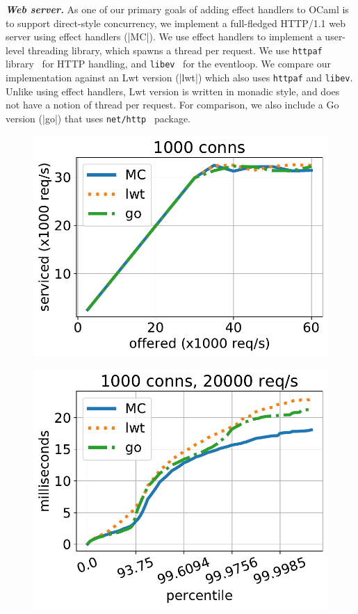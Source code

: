 \documentclass[sigplan,10pt,review,anonymous]{acmart}\settopmatter{printfolios=true,printccs=false,printacmref=false}
\begin{document}
\textbf{\textit{Web server.}} As one of our primary goals of adding effect handlers to
OCaml is to support direct-style concurrency, we implement a full-fledged
HTTP/1.1 web server using effect handlers (|MC|). We use effect handlers to
implement a user-level threading library, which spawns a thread per request. We
use \texttt{httpaf} library~\cite{httpaf} for HTTP handling, and
\texttt{libev}~\cite{libev} for the eventloop. We compare our implementation
against an Lwt version (|lwt|) which also uses \texttt{httpaf} and
\texttt{libev}. Unlike using effect handlers, Lwt version is written in monadic
style, and does not have a notion of thread per request. For comparison, we
also include a Go version (|go|) that uses \texttt{net/http}~\cite{nethttp}
package.

\begin{figure}
	\begin{minipage}{0.49\linewidth}
		\centering
		\includegraphics[width=\linewidth]{http-benchmarks/throughput.pdf}
		\label{grf:throughput}
	\end{minipage}
	\begin{minipage}{0.49\linewidth}
		\includegraphics[width=\linewidth]{http-benchmarks/latency.pdf}

\end{minipage}
\end{figure}
\end{document}
